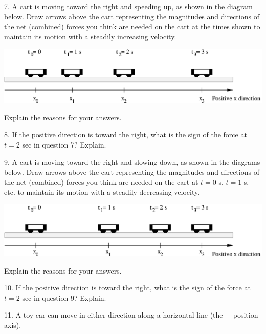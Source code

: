 7. A cart is moving toward the right and speeding up, as shown in the diagram
below. Draw arrows above the cart representing the magnitudes and directions
of the net (combined) forces you think are needed on the cart at the times shown
to maintain its motion with a steadily increasing velocity.

\vspace{0.3cm}
{\par\centering \includegraphics{force2/force2_fig8.eps} \par}
\vspace{0.3cm}

Explain the reasons for your answers.
\vspace{20mm}

8. If the positive direction is toward the right, what is the sign of the force
at $t = 2$ sec in question 7? Explain.
\vspace{20mm}

9. A cart is moving toward the right and slowing down, as shown in the diagrams
below. Draw arrows above the cart representing the magnitudes and directions
of the net (combined) forces you think are needed on the cart at $t = 0$ s, 
$t
= 1$ s, etc. to maintain its motion with a steadily decreasing velocity.

\vspace{0.3cm}
{\par\centering \includegraphics{force2/force2_fig9.eps} \par}
\vspace{0.3cm}

Explain the reasons for your answers.
\vspace{30mm}

10. If the positive direction is toward the right, what is the sign of the force
at $t = 2$ sec in question 9? Explain.
\vspace{30mm}

11. A toy car can move in either direction along a horizontal line (the + position
axis).

